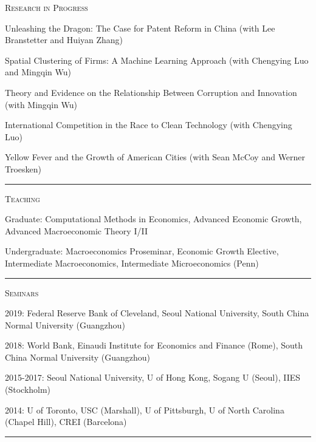 \documentclass{article}
\begin{document}
\parbox{\textwidth}{
\parbox[t]{0.28\textwidth}{ \raggedright \noindent \textsc{ Research in Progress } }
\parbox[t]{0.72\textwidth}{ \raggedright

Unleashing the Dragon: The Case for Patent Reform in China (with Lee Branstetter and Huiyan Zhang)
\vspace{0.27cm}

Spatial Clustering of Firms: A Machine Learning Approach (with Chengying Luo and Mingqin Wu)
\vspace{0.27cm}

Theory and Evidence on the Relationship Between Corruption and Innovation (with Mingqin Wu)
\vspace{0.27cm}

International Competition in the Race to Clean Technology (with Chengying Luo)
\vspace{0.27cm}

Yellow Fever and the Growth of American Cities (with Sean McCoy and Werner Troesken)
\vspace{0.27cm}

}
\textcolor{light-gray}{\hrule}
}
\vspace{0.3cm}

\parbox{\textwidth}{
\parbox[t]{0.28\textwidth}{ \raggedright \noindent \textsc{ Teaching } }
\parbox[t]{0.72\textwidth}{ \raggedright

Graduate: Computational Methods in Economics, Advanced Economic Growth, Advanced Macroeconomic Theory I/II
\vspace{0.27cm}

Undergraduate: Macroeconomics Proseminar, Economic Growth Elective, Intermediate Macroeconomics, Intermediate Microeconomics (Penn)
\vspace{0.27cm}

}
\textcolor{light-gray}{\hrule}
}
\vspace{0.3cm}

\parbox{\textwidth}{
\parbox[t]{0.28\textwidth}{ \raggedright \noindent \textsc{ Seminars } }
\parbox[t]{0.72\textwidth}{ \raggedright

2019: Federal Reserve Bank of Cleveland, Seoul National University, South China Normal University (Guangzhou)
\vspace{0.27cm}

2018: World Bank, Einaudi Institute for Economics and Finance (Rome), South China Normal University (Guangzhou)
\vspace{0.27cm}

2015-2017: Seoul National University, U of Hong Kong, Sogang U (Seoul), IIES (Stockholm)
\vspace{0.27cm}

2014: U of Toronto, USC (Marshall), U of Pittsburgh, U of North Carolina (Chapel Hill), CREI (Barcelona)
\vspace{0.27cm}

}
\textcolor{light-gray}{\hrule}
}
\vspace{0.3cm}
\end{document}
